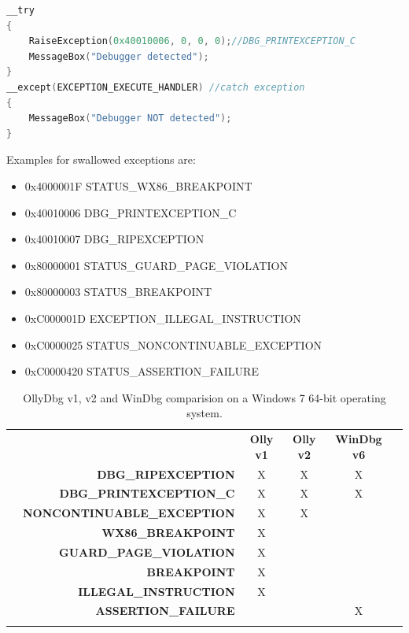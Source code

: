 \documentclass[10pt,a4paper]{article}
\begin{document}
\begin{lstlisting}[language=C, caption=Raise Exception Example]
__try
{
    RaiseException(0x40010006, 0, 0, 0);//DBG_PRINTEXCEPTION_C
    MessageBox("Debugger detected");
}
__except(EXCEPTION_EXECUTE_HANDLER) //catch exception
{
    MessageBox("Debugger NOT detected");
}
\end{lstlisting}

Examples for swallowed exceptions are:

\begin{itemize}
\item 0x4000001F STATUS\_WX86\_BREAKPOINT
\item 0x40010006 DBG\_PRINTEXCEPTION\_C
\item 0x40010007 DBG\_RIPEXCEPTION
\item 0x80000001 STATUS\_GUARD\_PAGE\_VIOLATION
\item 0x80000003 STATUS\_BREAKPOINT
\item 0xC000001D EXCEPTION\_ILLEGAL\_INSTRUCTION
\item 0xC0000025 STATUS\_NONCONTINUABLE\_EXCEPTION
\item 0xC0000420 STATUS\_ASSERTION\_FAILURE
\end{itemize}

\begin{table}[H]
\caption{OllyDbg v1, v2 and WinDbg comparision on a Windows 7 64-bit operating system.}
\begin{tabular}{lrcccl}
 & \multicolumn{1}{c}{} & \textbf{Olly v1}    & \textbf{Olly v2}    & \textbf{WinDbg v6}    &  \\
 & \textbf{DBG\_RIPEXCEPTION}     & X                    & X                    & X                    &  \\
 & \textbf{DBG\_PRINTEXCEPTION\_C}      & X                    & X                    & X                    &  \\
 & \textbf{NONCONTINUABLE\_EXCEPTION}      & X                    & X                    &                     &  \\
 & \textbf{WX86\_BREAKPOINT}      & X                    &                     &                     &  \\
 & \textbf{GUARD\_PAGE\_VIOLATION}      & X                    &                     &                     &  \\
 & \textbf{BREAKPOINT}      & X                    &                     &                     &  \\
 & \textbf{ILLEGAL\_INSTRUCTION}      & X                    &                     &                     &  \\
 & \textbf{ASSERTION\_FAILURE}      &                     &                     & X                    &  \\
 & \multicolumn{1}{l}{} & \multicolumn{1}{l}{} & \multicolumn{1}{l}{} & \multicolumn{1}{l}{} & 
\end{tabular}
\end{table}
\end{document}
